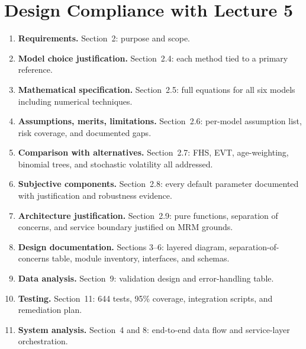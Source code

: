 \documentclass[11pt]{article}
\begin{document}
\section{Design Compliance with Lecture 5}

\begin{enumerate}
  \item \textbf{Requirements.}  Section~2: purpose and scope.
  \item \textbf{Model choice justification.}  Section~2.4: each method
    tied to a primary reference.
  \item \textbf{Mathematical specification.}  Section~2.5: full equations
    for all six models including numerical techniques.
  \item \textbf{Assumptions, merits, limitations.}  Section~2.6: per-model
    assumption list, risk coverage, and documented gaps.
  \item \textbf{Comparison with alternatives.}  Section~2.7: FHS, EVT,
    age-weighting, binomial trees, and stochastic volatility all addressed.
  \item \textbf{Subjective components.}  Section~2.8: every default
    parameter documented with justification and robustness evidence.
  \item \textbf{Architecture justification.}  Section~2.9: pure functions,
    separation of concerns, and service boundary justified on MRM grounds.
  \item \textbf{Design documentation.}  Sections 3--6: layered diagram,
    separation-of-concerns table, module inventory, interfaces, and schemas.
  \item \textbf{Data analysis.}  Section~9: validation design and
    error-handling table.
  \item \textbf{Testing.}  Section~11: 644 tests, 95\% coverage,
    integration scripts, and remediation plan.
  \item \textbf{System analysis.}  Section~4 and 8: end-to-end data flow
    and service-layer orchestration.
\end{enumerate}
\end{document}

